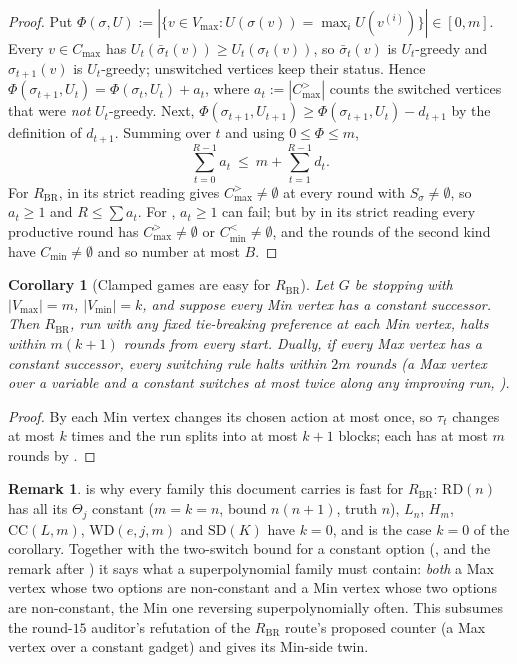 \documentclass[11pt]{article}
\theoremstyle{plain}
\newtheorem{corollary}[theorem]{Corollary}
\theoremstyle{definition}
\newtheorem{remark}[theorem]{Remark}
\newcommand{\Vmax}{V_{\max}}
\newcommand{\Vmin}{V_{\min}}
\begin{document}
\begin{proof}
Put $\Phi(\sigma,U):=|\{v\in\Vmax: U(\sigma(v))=\max_iU(v^{(i)})\}|\in[0,m]$.
Every $v\in C_{\max}$ has $U_t(\bar\sigma_t(v))\ge U_t(\sigma_t(v))$, so
$\bar\sigma_t(v)$ is $U_t$-greedy and $\sigma_{t+1}(v)$ is $U_t$-greedy;
unswitched vertices keep their status.  Hence
$\Phi(\sigma_{t+1},U_t)=\Phi(\sigma_t,U_t)+a_t$, where $a_t:=|C^{>}_{\max}|$
counts the switched vertices that were \emph{not} $U_t$-greedy.  Next,
$\Phi(\sigma_{t+1},U_{t+1})\ge\Phi(\sigma_{t+1},U_t)-d_{t+1}$ by the
definition of $d_{t+1}$.  Summing over $t$ and using $0\le\Phi\le m$,
\[
  \sum_{t=0}^{R-1}a_t\ \le\ m+\sum_{t=1}^{R-1}d_t .
\]
For $R_{\mathrm{BR}}$,  in its strict reading gives
$C^{>}_{\max}\ne\emptyset$ at every round with $S_\sigma\ne\emptyset$, so
$a_t\ge1$ and $R\le\sum a_t$.  For , $a_t\ge1$ can fail; but by
 in its strict reading every productive round has
$C^{>}_{\max}\ne\emptyset$ or $C^{<}_{\min}\ne\emptyset$, and the rounds of
the second kind have $C_{\min}\ne\emptyset$ and so number at most $B$.
\end{proof}

\begin{corollary}[Clamped games are easy for $R_{\mathrm{BR}}$]\label{cor:clamp}
Let $G$ be stopping with $|\Vmax|=m$, $|\Vmin|=k$, and suppose every Min
vertex has a constant successor.  Then $R_{\mathrm{BR}}$, run with any fixed
tie-breaking preference at each Min vertex, halts within $m(k+1)$ rounds from
every start.  Dually, if every Max vertex has a constant successor, every
switching rule halts within $2m$ rounds (a Max vertex over a variable and a constant switches at most twice along any improving run, ).
\end{corollary}

\begin{proof}
By  each Min vertex changes its chosen action at most once,
so $\tau_t$ changes at most $k$ times and the run splits into at most $k+1$
blocks; each has at most $m$ rounds by .
\end{proof}

\begin{remark}\label{rem:clamp}
 is why every family this document carries is fast for
$R_{\mathrm{BR}}$: $\mathrm{RD}(n)$ has all its $\Theta_j$ constant
($m=k=n$, bound $n(n+1)$, truth $n$), $L_n$, $H_m$, $\mathrm{CC}(L,m)$,
$\mathrm{WD}(e,j,m)$ and $\mathrm{SD}(K)$ have $k=0$, and
 is the case $k=0$ of the corollary.  Together with
the two-switch bound for a constant option (, and the remark after ) it says what a superpolynomial family must contain:
\emph{both} a Max vertex whose two options are non-constant and a Min vertex
whose two options are non-constant, the Min one reversing superpolynomially
often.  This subsumes the round-$15$ auditor's refutation of the $R_{\mathrm{BR}}$
route's proposed counter (a Max vertex over a constant gadget) and gives its
Min-side twin.
\end{remark}
\end{document}
